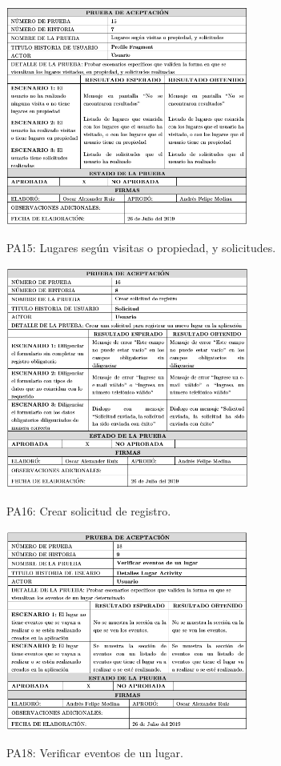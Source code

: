 \documentclass[12pt,letterpaper,openany]{book}
\begin{document}
\begin{table}[H]
\centering
\includegraphics[width=8cm]{./imagenes/PA/PA15}
\caption{PA15: Lugares según visitas o propiedad, y solicitudes.}
\end{table}

\begin{table}[H]
\centering
\includegraphics[width=8cm]{./imagenes/PA/PA16}
\caption{PA16: Crear solicitud de registro.}
\end{table}

\begin{table}[H]
\centering
\includegraphics[width=8cm]{./imagenes/PA/PA18}
\caption{PA18: Verificar eventos de un lugar.}
\end{table}
\end{document}
